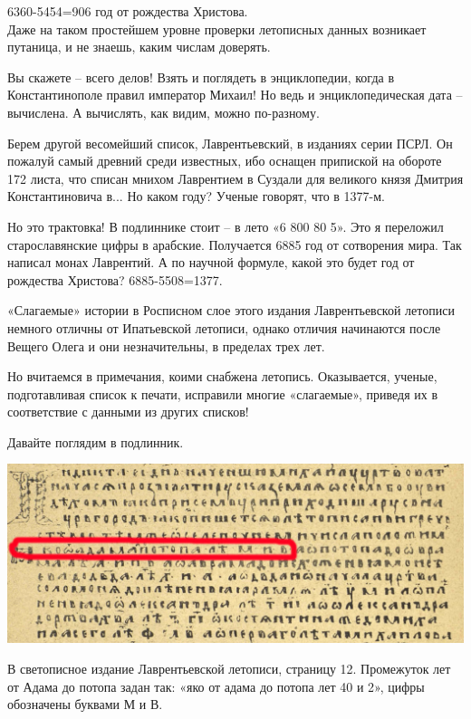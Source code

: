 6360-5454=906 год от рождества Христова.\\

Даже на таком простейшем уровне проверки летописных данных возникает путаница, и не знаешь, каким числам доверять.

Вы скажете – всего делов! Взять и поглядеть в энциклопедии, когда в Константинополе правил император Михаил! Но ведь и энциклопедическая дата – вычислена. А вычислять, как видим, можно по-разному.

Берем другой весомейший список, Лаврентьевский, в изданиях серии ПСРЛ. Он пожалуй самый древний среди известных, ибо оснащен припиской на обороте 172 листа, что списан мнихом Лаврентием в Суздали для великого князя Дмитрия Константиновича в... Но каком году? Ученые говорят, что в 1377-м. 

Но это трактовка! В подлиннике стоит – в лето «6 800 80 5». Это я переложил старославянские цифры в арабские. Получается 6885 год от сотворения мира. Так написал монах Лаврентий. А по научной формуле, какой это будет год от рождества Христова? 6885-5508=1377.

«Слагаемые» истории в Росписном слое этого издания Лаврентьевской летописи немного отличны от Ипатьевской летописи, однако отличия начинаются после Вещего Олега и они незначительны, в пределах трех лет.

Но вчитаемся в примечания, коими снабжена летопись. Оказывается, ученые, подготавливая список к печати, исправили многие «слагаемые», приведя их в соответствие с данными из других списков!

Давайте поглядим в подлинник. 

\begin{center}
\includegraphics[width=\linewidth]{chast-colebanie-osnov/letois/lavr-sveto-01.jpg}
\end{center}

В светописное издание Лаврентьевской летописи, страницу 12. Промежуток лет от Адама до потопа задан так: «яко от адама до потопа лет 40 и 2», цифры обозначены буквами М и В.

